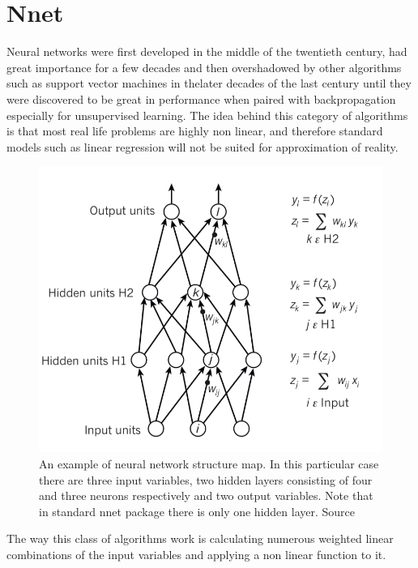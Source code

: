 \documentclass[a4paper,12pt]{article}
\begin{document}
\section{Nnet}

Neural networks were first developed in the middle of the twentieth century, had great importance for a few decades and then overshadowed by other algorithms such as support vector machines in thelater decades of the last century until they were discovered to be great in performance when paired with backpropagation especially for unsupervised learning.
The idea behind this category of algorithms is that most real life problems are highly non linear, and therefore standard models such as linear regression will not be suited for approximation of reality.
\begin{figure}
  \begin{minipage}[c]{0.65\textwidth}
    \includegraphics[width=\textwidth]{pictures/nnet_1.png}
  \end{minipage}\hfill
  \begin{minipage}[c]{0.35\textwidth}
    \caption{An example of neural network structure map. In this particular case there are three input variables, two hidden layers consisting of four and three neurons respectively and two output variables.
    Note that in standard nnet package there is only one hidden layer. Source \cite{nature}}
    \label{Figure::Nnet_1}
  \end{minipage}
\end{figure}
The way this class of algorithms work is calculating numerous weighted linear combinations of the input variables and applying a non linear function to it.
\end{document}
